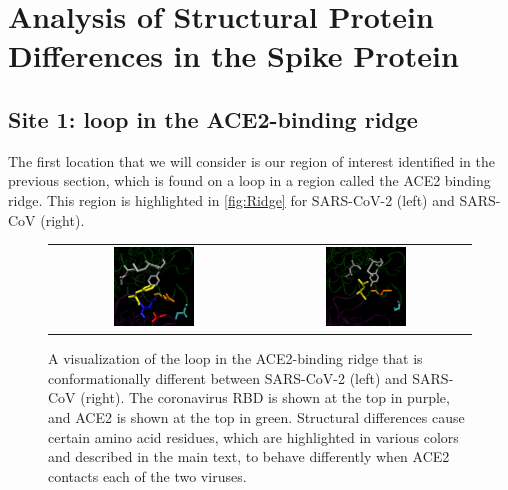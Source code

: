 \FloatBarrier
{}
\section{Analysis of Structural Protein Differences in the Spike Protein}
\label{sec:structural_differences}

\subsection{Site 1: loop in the ACE2-binding ridge}

The first location that we will consider is our region of interest identified in the previous section, which is found on a loop in a region called the ACE2 binding ridge. This region is highlighted in \autoref{fig:Ridge} for SARS-CoV-2 (left) and SARS-CoV (right).

\begin{figure}[h]
	\centering
	\mySfFamily
	\begin{tabular}{c c}
	\includegraphics[width = 0.4\textwidth]{../images/Ridge_SARS-2.png} & \includegraphics[width = 0.4\textwidth]{../images/Ridge_SARS.png}
	\end{tabular}
	\caption{A visualization of the loop in the ACE2-binding ridge that is conformationally different between SARS-CoV-2 (left) and SARS-CoV (right). The coronavirus RBD is shown at the top in purple, and ACE2 is shown at the top in green. Structural differences cause certain amino acid residues, which are highlighted in various colors and described in the main text, to behave differently when ACE2 contacts each of the two viruses.}
	\label{fig:Ridge}
\end{figure}

